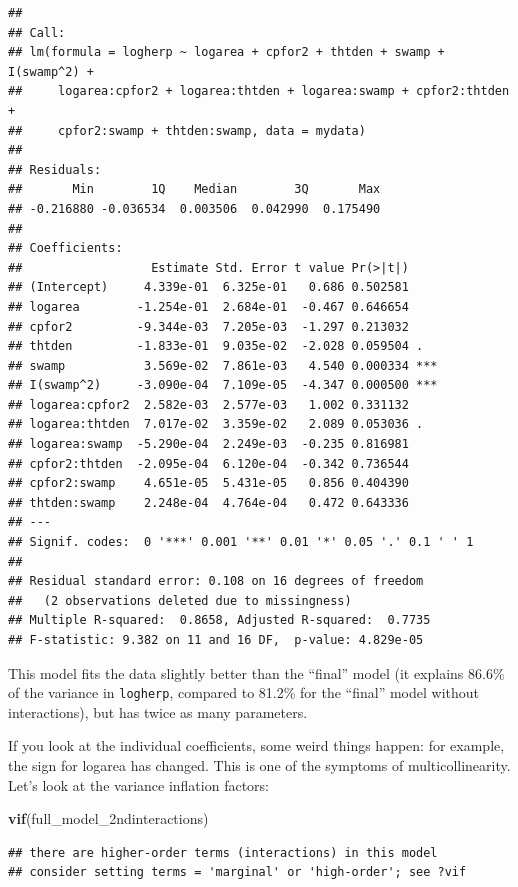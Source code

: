\documentclass[
  12pt,
]{book}
\newenvironment{Shaded}{\begin{snugshade}}{\end{snugshade}}
\newcommand{\KeywordTok}[1]{\textcolor[rgb]{0.13,0.29,0.53}{\textbf{#1}}}
\newcommand{\NormalTok}[1]{#1}
\begin{document}
\begin{verbatim}
## 
## Call:
## lm(formula = logherp ~ logarea + cpfor2 + thtden + swamp + I(swamp^2) + 
##     logarea:cpfor2 + logarea:thtden + logarea:swamp + cpfor2:thtden + 
##     cpfor2:swamp + thtden:swamp, data = mydata)
## 
## Residuals:
##       Min        1Q    Median        3Q       Max 
## -0.216880 -0.036534  0.003506  0.042990  0.175490 
## 
## Coefficients:
##                  Estimate Std. Error t value Pr(>|t|)    
## (Intercept)     4.339e-01  6.325e-01   0.686 0.502581    
## logarea        -1.254e-01  2.684e-01  -0.467 0.646654    
## cpfor2         -9.344e-03  7.205e-03  -1.297 0.213032    
## thtden         -1.833e-01  9.035e-02  -2.028 0.059504 .  
## swamp           3.569e-02  7.861e-03   4.540 0.000334 ***
## I(swamp^2)     -3.090e-04  7.109e-05  -4.347 0.000500 ***
## logarea:cpfor2  2.582e-03  2.577e-03   1.002 0.331132    
## logarea:thtden  7.017e-02  3.359e-02   2.089 0.053036 .  
## logarea:swamp  -5.290e-04  2.249e-03  -0.235 0.816981    
## cpfor2:thtden  -2.095e-04  6.120e-04  -0.342 0.736544    
## cpfor2:swamp    4.651e-05  5.431e-05   0.856 0.404390    
## thtden:swamp    2.248e-04  4.764e-04   0.472 0.643336    
## ---
## Signif. codes:  0 '***' 0.001 '**' 0.01 '*' 0.05 '.' 0.1 ' ' 1
## 
## Residual standard error: 0.108 on 16 degrees of freedom
##   (2 observations deleted due to missingness)
## Multiple R-squared:  0.8658, Adjusted R-squared:  0.7735 
## F-statistic: 9.382 on 11 and 16 DF,  p-value: 4.829e-05
\end{verbatim}

This model fits the data slightly better than the ``final'' model (it explains 86.6\% of the variance in \texttt{logherp}, compared to 81.2\% for the ``final'' model without interactions), but has twice as many parameters.

If you look at the individual coefficients, some weird things happen: for example, the sign for logarea has changed. This is one of the symptoms of multicollinearity. Let's look at the variance inflation factors:

\begin{Shaded}
\begin{Highlighting}[]
\KeywordTok{vif}\NormalTok{(full\_model\_2ndinteractions)}
\end{Highlighting}
\end{Shaded}

\begin{verbatim}
## there are higher-order terms (interactions) in this model
## consider setting terms = 'marginal' or 'high-order'; see ?vif
\end{verbatim}
\end{document}
